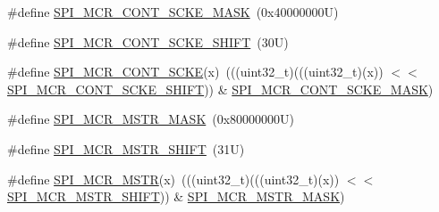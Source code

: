 \begin{DoxyCompactItemize}
\item 
\#define \mbox{\hyperlink{group___c_a_n___register___masks_gad40a2cace787fe5eaaf74379ffb7cfc2}{S\+P\+I\+\_\+\+M\+C\+R\+\_\+\+C\+O\+N\+T\+\_\+\+S\+C\+K\+E\+\_\+\+M\+A\+SK}}~(0x40000000\+U)
\item 
\#define \mbox{\hyperlink{group___c_a_n___register___masks_ga57c862186e43a26823716267bfadd92f}{S\+P\+I\+\_\+\+M\+C\+R\+\_\+\+C\+O\+N\+T\+\_\+\+S\+C\+K\+E\+\_\+\+S\+H\+I\+FT}}~(30\+U)
\item 
\#define \mbox{\hyperlink{group___c_a_n___register___masks_ga741c4834ced3eb76c50fd2e161791689}{S\+P\+I\+\_\+\+M\+C\+R\+\_\+\+C\+O\+N\+T\+\_\+\+S\+C\+KE}}(x)~(((uint32\+\_\+t)(((uint32\+\_\+t)(x)) $<$$<$ \mbox{\hyperlink{group___c_a_n___register___masks_ga57c862186e43a26823716267bfadd92f}{S\+P\+I\+\_\+\+M\+C\+R\+\_\+\+C\+O\+N\+T\+\_\+\+S\+C\+K\+E\+\_\+\+S\+H\+I\+FT}})) \& \mbox{\hyperlink{group___c_a_n___register___masks_gad40a2cace787fe5eaaf74379ffb7cfc2}{S\+P\+I\+\_\+\+M\+C\+R\+\_\+\+C\+O\+N\+T\+\_\+\+S\+C\+K\+E\+\_\+\+M\+A\+SK}})
\item 
\#define \mbox{\hyperlink{group___c_a_n___register___masks_gaa201344af736c83618497329b6529f04}{S\+P\+I\+\_\+\+M\+C\+R\+\_\+\+M\+S\+T\+R\+\_\+\+M\+A\+SK}}~(0x80000000\+U)
\item 
\#define \mbox{\hyperlink{group___c_a_n___register___masks_ga7118ec0360c840ddef7e666831cb13fb}{S\+P\+I\+\_\+\+M\+C\+R\+\_\+\+M\+S\+T\+R\+\_\+\+S\+H\+I\+FT}}~(31\+U)
\item 
\#define \mbox{\hyperlink{group___c_a_n___register___masks_ga8c511b3daf106ff16f3b1ecec55ef2d2}{S\+P\+I\+\_\+\+M\+C\+R\+\_\+\+M\+S\+TR}}(x)~(((uint32\+\_\+t)(((uint32\+\_\+t)(x)) $<$$<$ \mbox{\hyperlink{group___c_a_n___register___masks_ga7118ec0360c840ddef7e666831cb13fb}{S\+P\+I\+\_\+\+M\+C\+R\+\_\+\+M\+S\+T\+R\+\_\+\+S\+H\+I\+FT}})) \& \mbox{\hyperlink{group___c_a_n___register___masks_gaa201344af736c83618497329b6529f04}{S\+P\+I\+\_\+\+M\+C\+R\+\_\+\+M\+S\+T\+R\+\_\+\+M\+A\+SK}})
\end{DoxyCompactItemize}
